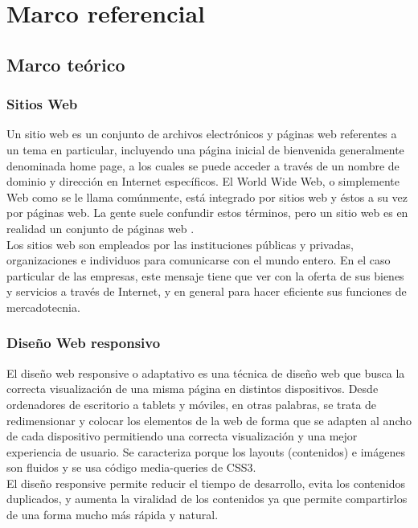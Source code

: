 \section{Marco referencial}

	\subsection{Marco teórico}
	
		\subsubsection{Sitios Web}
		
		{Un sitio web es un conjunto de archivos electrónicos y páginas web referentes a un tema en particular, incluyendo una página inicial de bienvenida generalmente denominada home page, a los cuales se puede acceder a través de un nombre de dominio y dirección en Internet específicos. El World Wide Web, o simplemente Web como se le llama comúnmente, está integrado por sitios web y éstos a su vez por páginas web. La gente suele confundir estos términos, pero un sitio web es en realidad un conjunto de páginas web .\\
			
		Los sitios web son empleados por las instituciones públicas y privadas, organizaciones e individuos para comunicarse con el mundo entero. En el caso particular de las empresas, este mensaje tiene que ver con la oferta de sus bienes y servicios a través de Internet, y en general para hacer eficiente sus funciones de mercadotecnia.}
	
	
		\subsubsection{Diseño Web responsivo}
		
		{El diseño web responsive o adaptativo es una técnica de diseño web que busca la correcta visualización de una misma página en distintos dispositivos. Desde ordenadores de escritorio a tablets y móviles, en otras palabras, se trata de redimensionar y colocar los elementos de la web de forma que se adapten al ancho de cada dispositivo permitiendo una correcta visualización y una mejor experiencia de usuario. Se caracteriza porque los layouts (contenidos) e imágenes son fluidos y se usa código media-queries de CSS3.\\
			
		El diseño responsive permite reducir el tiempo de desarrollo, evita los contenidos duplicados, y aumenta la viralidad de los contenidos ya que permite compartirlos de una forma mucho más rápida y natural.}
	
